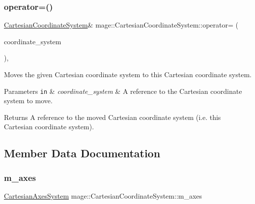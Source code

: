 \subsubsection{\texorpdfstring{operator=()}{operator=()}\hspace{0.1cm}{\footnotesize\ttfamily [2/2]}}
{\footnotesize\ttfamily \hyperlink{structmage_1_1_cartesian_coordinate_system}{Cartesian\+Coordinate\+System}\& mage\+::\+Cartesian\+Coordinate\+System\+::operator= (\begin{DoxyParamCaption}\item[{\hyperlink{structmage_1_1_cartesian_coordinate_system}{Cartesian\+Coordinate\+System} \&\&}]{coordinate\+\_\+system }\end{DoxyParamCaption})\hspace{0.3cm}{\ttfamily [default]}, {\ttfamily [noexcept]}}

Moves the given Cartesian coordinate system to this Cartesian coordinate system.


\begin{DoxyParams}[1]{Parameters}
\mbox{\tt in}  & {\em coordinate\+\_\+system} & A reference to the Cartesian coordinate system to move. \\
\hline
\end{DoxyParams}
\begin{DoxyReturn}{Returns}
A reference to the moved Cartesian coordinate system (i.\+e. this Cartesian coordinate system). 
\end{DoxyReturn}


\subsection{Member Data Documentation}
\hypertarget{structmage_1_1_cartesian_coordinate_system_acf7b8cf35026f5fa8fc11a126b96b055}{}\label{structmage_1_1_cartesian_coordinate_system_acf7b8cf35026f5fa8fc11a126b96b055} 
\subsubsection{\texorpdfstring{m\+\_\+axes}{m\_axes}}
{\footnotesize\ttfamily \hyperlink{structmage_1_1_cartesian_axes_system}{Cartesian\+Axes\+System} mage\+::\+Cartesian\+Coordinate\+System\+::m\+\_\+axes\hspace{0.3cm}{\ttfamily [private]}}

